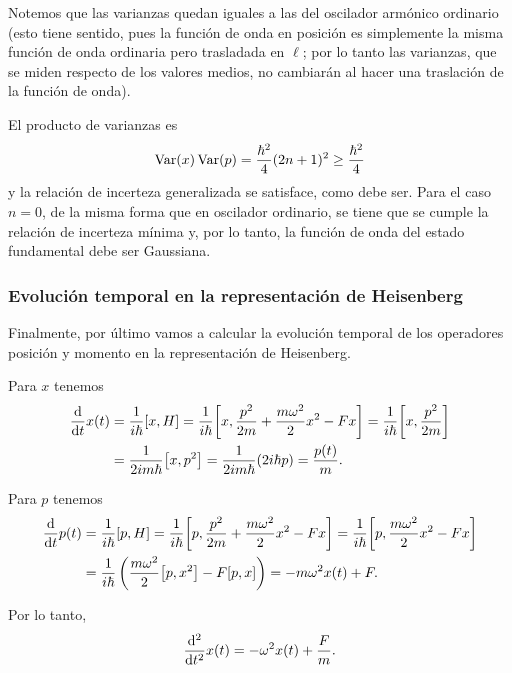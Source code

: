 \documentclass[10pt, a4paper]{article}
\numberwithin{equation}{subsection}
\begin{document}
Notemos que las varianzas quedan iguales a las del oscilador armónico ordinario
(esto tiene sentido, pues la función de onda en posición es simplemente la
misma función de onda ordinaria pero trasladada en $\ell$; por lo tanto las
varianzas, que se miden respecto de los valores medios, no cambiarán al hacer
una traslación de la función de onda).

El producto de varianzas es
\begin{equation}
  \Var(x)\Var(p) = \frac{\hbar^2}{4}(2n + 1)^2 \geq
  \frac{\hbar^2}{4}
\end{equation}
y la relación de incerteza generalizada se satisface, como debe ser. Para el
caso $n = 0$, de la misma forma que en oscilador ordinario, se tiene que se
cumple la relación de incerteza mínima y, por lo tanto, la función de onda del
estado fundamental debe ser Gaussiana.

\subsubsection{Evolución temporal en la representación de Heisenberg}
Finalmente, por último vamos a calcular la evolución temporal de los operadores
posición y momento en la representación de Heisenberg.

Para $x$ tenemos
\begin{align}
  \dv{t}x(t) &= \frac{1}{i\hbar}\comm{x}{H} =
    \frac{1}{i\hbar}\comm{x}{\frac{p^2}{2m} + \frac{m\omega^2}{2}x^2 - Fx} =
    \frac{1}{i\hbar}\comm{x}{\frac{p^2}{2m}} \\
  &= \frac{1}{2im\hbar}\comm{x}{p^2} = \frac{1}{2im\hbar}(2i\hbar p) =
    \frac{p(t)}{m}.
\end{align}

Para $p$ tenemos
\begin{align}
  \dv{t}p(t) &= \frac{1}{i\hbar}\comm{p}{H} =
    \frac{1}{i\hbar}\comm{p}{\frac{p^2}{2m} + \frac{m\omega^2}{2}x^2 - Fx} =
    \frac{1}{i\hbar}\comm{p}{\frac{m\omega^2}{2}x^2 - Fx} \\
  &= \frac{1}{i\hbar}\left(\frac{m\omega^2}{2}\comm{p}{x^2} -
    F\comm{p}{x}\right) = -m\omega^2 x(t) + F.
\end{align}

Por lo tanto,
\begin{equation}
  \dv[2]{t} x(t) = -\omega^2 x(t) + \frac{F}{m}.
\end{equation}
\end{document}

